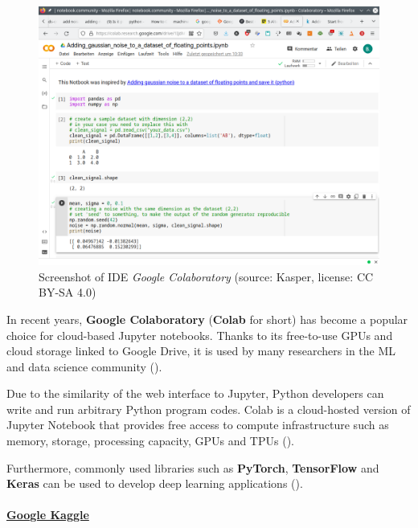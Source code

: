 \documentclass [oneside,10pt,a4paper,ngerman,BCOR10mm,headsepline,parindent,final]{scrartcl}
\begin{document}
\begin{figure}
\centering
\includegraphics{images/Screenshot_google_Colab.png}
\caption{Screenshot of IDE \emph{Google Colaboratory} (source: Kasper,
license: CC BY-SA 4.0)}
\end{figure}

In recent years, \textbf{Google Colaboratory} (\textbf{Colab} for short)
has become a popular choice for cloud-based Jupyter notebooks. Thanks to
its free-to-use GPUs and cloud storage linked to Google Drive, it is
used by many researchers in the ML and data science community
(\cite{Colab_Alternatives_2021}).

Due to the similarity of the web interface to Jupyter, Python developers
can write and run arbitrary Python program codes. Colab is a
cloud-hosted version of Jupyter Notebook that provides free access to
compute infrastructure such as memory, storage, processing capacity,
GPUs and TPUs (\cite{Colab_about_2022}).

Furthermore, commonly used libraries such as \textbf{PyTorch},
\textbf{TensorFlow} and \textbf{Keras} can be used to develop deep
learning applications (\cite{Colab_5_Alternatives_2021}).

    \hypertarget{google-kaggle}{%
\paragraph{\texorpdfstring{\href{https://www.kaggle.com}{Google
Kaggle}}{Google Kaggle}}\label{google-kaggle}}
\end{document}
